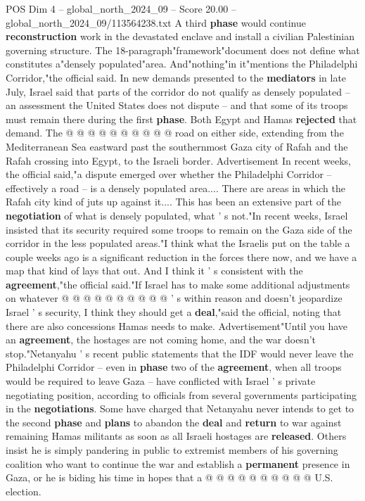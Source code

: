 \begin{textsample}{POS Dim 4 – global\_north\_2024\_09 – Score 20.00 – global\_north\_2024\_09/113564238.txt}
A third \textbf{phase} would continue \textbf{reconstruction} work in the devastated enclave and install a civilian Palestinian governing structure.
The 18-paragraph"framework"document does not define what constitutes a"densely populated"area.
And"nothing"in it"mentions the Philadelphi Corridor,"the official said.
In new demands presented to the \textbf{mediators} in late July, Israel said that parts of the corridor do not qualify as densely populated -- an assessment the United States does not dispute -- and that some of its troops must remain there during the first \textbf{phase}.
Both Egypt and Hamas \textbf{rejected} that demand.
The @ @ @ @ @ @ @ @ @ @ road on either side, extending from the Mediterranean Sea eastward past the southernmost Gaza city of Rafah and the Rafah crossing into Egypt, to the Israeli border.
Advertisement In recent weeks, the official said,"a dispute emerged over whether the Philadelphi Corridor -- effectively a road -- is a densely populated area....
There are areas in which the Rafah city kind of juts up against it....
This has been an extensive part of the \textbf{negotiation} of what is densely populated, what ' s not."In recent weeks, Israel insisted that its security required some troops to remain on the Gaza side of the corridor in the less populated areas."I think what the Israelis put on the table a couple weeks ago is a significant reduction in the forces there now, and we have a map that kind of lays that out.
And I think it ' s consistent with the \textbf{agreement},"the official said."If Israel has to make some additional adjustments on whatever @ @ @ @ @ @ @ @ @ @ ' s within reason and doesn't jeopardize Israel ' s security, I think they should get a \textbf{deal},"said the official, noting that there are also concessions Hamas needs to make.
Advertisement"Until you have an \textbf{agreement}, the hostages are not coming home, and the war doesn't stop."Netanyahu ' s recent public statements that the IDF would never leave the Philadelphi Corridor -- even in \textbf{phase} two of the \textbf{agreement}, when all troops would be required to leave Gaza -- have conflicted with Israel ' s private negotiating position, according to officials from several governments participating in the \textbf{negotiations}.
Some have charged that Netanyahu never intends to get to the second \textbf{phase} and \textbf{plans} to abandon the \textbf{deal} and \textbf{return} to war against remaining Hamas militants as soon as all Israeli hostages are \textbf{released}.
Others insist he is simply pandering in public to extremist members of his governing coalition who want to continue the war and establish a \textbf{permanent} presence in Gaza, or he is biding his time in hopes that a @ @ @ @ @ @ @ @ @ @ U.S. election.

\end{textsample}

